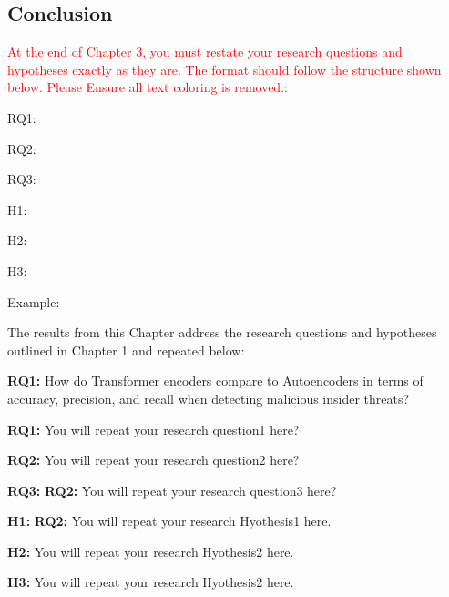 \lipsum[1] 
\subsection{ Conclusion}
\lipsum[1] 

\textcolor{red}{
At the end of Chapter 3, you must restate your research questions and hypotheses exactly as they are. The format should follow the structure shown below. Please Ensure all text coloring is removed.:}\par
RQ1:\par
RQ2:\par
RQ3:\par
H1:\par
H2:\par
H3:\par


 

Example:

The results from this Chapter address the research questions and hypotheses outlined in Chapter 1 and repeated below:


\textbf{RQ1:} How do Transformer encoders compare to Autoencoders in terms of accuracy, precision, and recall when detecting malicious insider threats?\par

\textbf{RQ1:} You will repeat your research question1 here?\par

\textbf{RQ2:} You will repeat your research question2 here?\par

\textbf{RQ3:} \textbf{RQ2:} You will repeat your research question3 here?\par\par

\textbf{H1:} \textbf{RQ2:} You will repeat your research Hyothesis1 here.\par

\textbf{H2:} You will repeat your research Hyothesis2 here.\par

\textbf{H3:} You will repeat your research Hyothesis2 here.\par



